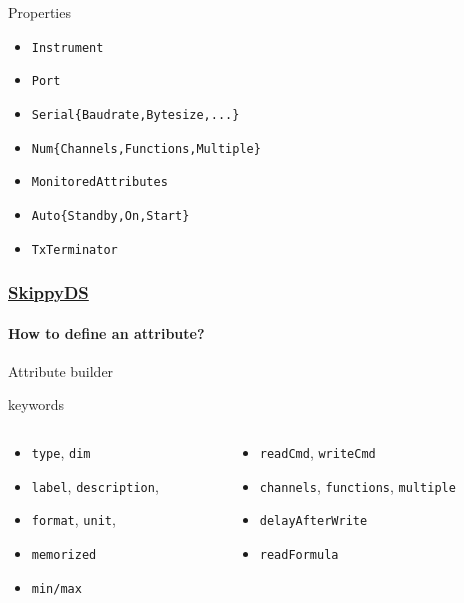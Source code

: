 \documentclass{beamer}
\begin{document}
\begin{frame}
\begin{textblock*}{210pt}
\begin{block}{Properties}
      \begin{itemize}
        \item {\tt Instrument}
        \item {\tt Port}
        \item {\tt Serial\{Baudrate,Bytesize,...\}}
        \item {\tt Num\{Channels,Functions,Multiple\}}
        \item {\tt MonitoredAttributes}
        \item {\tt Auto\{Standby,On,Start\}}
        \item {\tt TxTerminator}
      \end{itemize}
    \end{block}
  \end{textblock*}
\end{frame}

\begin{frame}
  \frametitle{\href{https://www.tango-controls.org/developers/dsc/ds/2376/}{SkippyDS}}
  \framesubtitle{How to define an attribute?}
  \begin{exampleblock}{Attribute builder}
    
  \end{exampleblock}
  \begin{block}{keywords}
     \begin{columns}
       \begin{column}{0.40\textwidth}
         \begin{itemize}
           \item {\tt type}, {\tt dim}
           \item {\tt label}, {\tt description}, 
           \item {\tt format}, {\tt unit}, 
           \item {\tt memorized}
           \item {\tt min/max}
         \end{itemize}
       \end{column}
       \begin{column}{0.40\textwidth}
         \begin{itemize}
           \item {\tt readCmd},  {\tt writeCmd}
           \item {\tt channels}, {\tt functions}, {\tt multiple}
           \item {\tt delayAfterWrite}
           \item {\tt readFormula}
         \end{itemize}
       \end{column}
     \end{columns}
  \end{block}
\end{frame}
\end{document}
